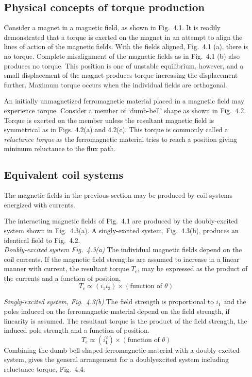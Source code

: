 \documentclass[a4paper,numbers=noenddot,12pt]{scrbook}
\begin{document}
\subsection{Physical concepts of torque production}
Consider a magnet in a magnetic field, as shown in Fig.\ 4.1. It is readily demonstrated that a torque is exerted on the magnet in an attempt to align the lines of action of the magnetic fields. With the fields aligned, Fig.\ 4.1 (a), there is no torque. Complete misalignment of the magnetic fields as in Fig.\ 4.1 (b) also produces no torque. This position is one of unstable equilibrium, however, and a small displacement of the magnet produces torque increasing the displacement further. Maximum torque occurs when the individual fields are orthogonal.

An initially unmagnetized ferromagnetic material placed in a magnetic field may experience torque. Consider a member of `dumb-bell' shape as shown in Fig.\ 4.2. Torque is exerted on the member unless the resultant magnetic field is symmetrical as in Figs. 4.2(a) and 4.2(c). This torque is commonly called a \textit{reluctance torque} as the ferromagnetic material tries to reach a position giving minimum reluctance to the flux path.

\subsection{Equivalent coil systems}
The magnetic fields in the previous section may be produced by coil systems energized with currents.

The interacting magnetic fields of Fig.\ 4.1 are produced by the doubly-excited system shown in Fig.\ 4.3(a). A singly-excited system,  Fig.\ 4.3(b), produces an identical field to Fig.\ 4.2. \\[12pt]
\noindent \textit{Doubly-excited system Fig.\ 4.3(a)} The individual magnetic fields depend on the coil currents. If the magnetic field strengths are assumed to increase in a linear manner with current, the resultant torque $T_e$, may be expressed as the product of the currents and a function of position,
\begin{equation}
    T_e \propto (i_1 i_2) \times (\text{function of } \theta)
    \label{eq:Eq4.1}
\end{equation}

\noindent \textit{Singly-excited system, Fig.\ 4.3(b)} The field strength is proportional to $i_1$ and the poles induced on the ferromagnetic material depend on the field strength, if linearity is assumed. The resultant torque is the product of the field strength, the induced pole strength and a function of position. 
\begin{equation}
    T_e \propto (i_1^2) \times (\text{function of } \theta)
    \label{eq:Eq4.2}
\end{equation}
Combining the dumb-bell shaped ferromagnetic material with a doubly-excited system, gives the general arrangement for a doubly­excited system including reluctance torque, Fig.\ 4.4.
\end{document}
